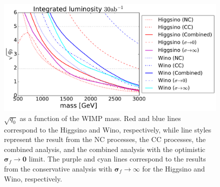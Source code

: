 \documentclass[12pt,twoside,book]{article}
\begin{document}
\begin{figure}[t]
  \centering
  \includegraphics[width=0.7\hsize]{mchi_vs_sqq0.pdf}
  \caption{
    $\sqrt{q_0}$ as a function of the WIMP mass.
    Red and blue lines correspond to the Higgsino and Wino, respectively, while line styles represent the result from the NC processes, the CC processes, the combined analysis, and the combined analysis with the optimistic $\bm{\sigma}_f \to \bm{0}$ limit.
    The purple and cyan lines correspond to the results from the conservative analysis with $\bm{\sigma}_f \to \infty$ for the Higgsino and Wino, respectively.
  }
  \label{fig_mchi_vs_sqq0}
\end{figure}
\end{document}
